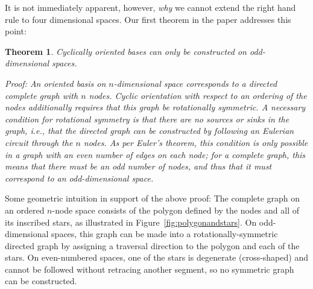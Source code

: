 \documentclass[11pt]{article}
\newtheorem{theorem}{Theorem}[section]
\begin{document}
It is not immediately apparent, however, \emph{why} we cannot extend the right hand rule to four dimensional spaces. Our first theorem in the paper addresses this point:



\begin{theorem}{Cyclically oriented bases can only be constructed on odd-dimensional spaces.}

Proof: An oriented basis on $n$-dimensional space corresponds to a directed complete graph with $n$ nodes. Cyclic orientation with respect to an ordering of the nodes additionally requires that this graph be rotationally symmetric. A necessary condition for rotational symmetry is that there are no sources or sinks in the graph, i.e., that the directed graph can be constructed by following an Eulerian circuit through the $n$ nodes. As per Euler’s theorem, this condition is only possible in a graph with an even number of edges on each node; for a complete graph, this means that there must be an odd number of nodes, and thus that it must correspond to an odd-dimensional space.

\end{theorem}


Some geometric intuition in support of the above proof: The complete graph on an ordered $n$-node space consists of the polygon defined by the nodes and all of its inscribed stars, as illustrated in Figure~\ref{fig:polygonandstars}. On odd-dimensional spaces, this graph can be made into a rotationally-symmetric directed graph by assigning a traversal direction to the polygon and each of the stars. On even-numbered spaces, one of the stars is degenerate (cross-shaped) and cannot be followed without retracing another segment, so no symmetric graph can be constructed.
\end{document}
